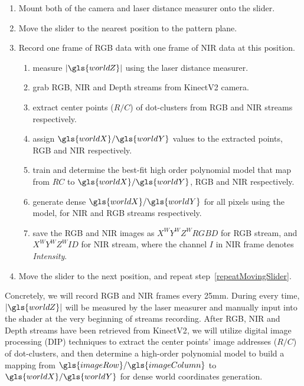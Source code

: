 \begin{enumerate}
   	\item Mount both of the camera and laser distance measurer onto the slider.
   	\item Move the slider to the nearest position to the pattern plane.
   	\item Record one frame of RGB data with one frame of \gls{NIR} data at this position.
   	\label{repeatMovingSlider}
   	\begin{enumerate}
     		\item measure \(|\gls{worldZ}|\) using the laser distance measurer.
     		\item grab RGB, \gls{NIR} and Depth streams from \gls{KinectV2} camera.
     		\item extract center points (\(R/C\)) of dot-clusters from RGB and \gls{NIR} streams respectively.
     		\item assign \(\gls{worldX}/\gls{worldY}\) values to the extracted points, RGB and \gls{NIR} respectively.
     		\item train and determine the best-fit high order polynomial model that map from \(RC\) to \(\gls{worldX}/\gls{worldY}\), RGB and \gls{NIR} respectively.
     		\item generate dense \(\gls{worldX}/\gls{worldY}\) for all pixels using the model, for \gls{NIR} and RGB streams respectively.
     		\item save the RGB and \gls{NIR} images as \(X^WY^WZ^WRGBD\) for RGB stream, and \(X^WY^WZ^WID\) for \gls{NIR} stream, where the channel \(I\) in \gls{NIR} frame denotes \emph{Intensity}.
   	\end{enumerate}
	\item Move the slider to the next position, and repeat step~\ref{repeatMovingSlider}.
\end{enumerate}
%
Concretely, we will record RGB and \gls{NIR} frames every 25mm. During every time, \(|\gls{worldZ}|\) will be measured by the laser measurer and manually input into the shader at the very beginning of streams recording. After RGB, \gls{NIR} and Depth streams have been retrieved from \gls{KinectV2}, we will utilize digital image processing (\gls{DIP}) techniques to extract the center points' image addresses (\(R/C\)) of dot-clusters, and then determine a high-order polynomial model to build a mapping from \(\gls{imageRow}/\gls{imageColumn}\) to \(\gls{worldX}/\gls{worldY}\) for dense world coordinates generation.

